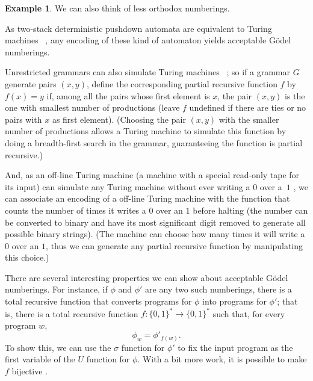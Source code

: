 \documentclass[12pt]{article}
\theoremstyle{definition}
\newtheorem{example}[definition]{Example}
\begin{document}
\begin{example}
    We can also think of less orthodox numberings.

    As two-stack deterministic pushdown automata are equivalent to Turing machines%
    ~\cite[p.~172]{HopcroftUllman1979},
    any encoding of these kind of automaton yields acceptable Gödel numberings.

    Unrestricted grammars can also simulate Turing machines%
    ~\cite[p.~221]{HopcroftUllman1979};
    so if a grammar $G$ generate pairs $(x, y)$,
    define the corresponding partial recursive function $f$
    by $f(x) = y$ if,
    among all the pairs whose first element is $x$,
    the pair $(x, y)$ is the one with smallest number of productions
    (leave $f$ undefined if there are ties or no pairs with $x$ as first element).
    (Choosing the pair $(x, y)$ with the smaller number of productions
    allows a Turing machine to simulate this function
    by doing a breadth-first search in the grammar,
    guaranteeing the function is partial recursive.)

    And, as an off-line Turing machine
    (a machine with a special read-only tape for its input)
    can simulate any Turing machine without ever writing a $0$ over a~$1$
    \cite[p.~174]{HopcroftUllman1979},
    we can associate an encoding of a off-line Turing machine
    with the function that counts the number of times
    it writes a $0$ over an $1$ before halting
    (the number can be converted to binary and have its most significant digit removed
    to generate all possible binary strings).
    (The machine can choose how many times it will write a $0$ over an $1$,
    thus we can generate any partial recursive function by manipulating this choice.)
\end{example}

There are several interesting properties we can show about acceptable Gödel numberings.
For instance,
if $\phi$ and $\phi'$ are any two such numberings,
there is a total recursive function that converts programs for $\phi$
into programs for $\phi'$;
that is, there is a total recursive function $f : \{0, 1\}^* \to \{0, 1\}^*$
such that, for every program $w$,
\begin{equation*}
    \phi_w = \phi'_{f(w)}.
\end{equation*}
To show this,
we can use the $\sigma$ function for $\phi'$
to fix the input program as the first variable of the $U$ function for $\phi$.
With a bit more work,
it is possible to make $f$ bijective \cite[p.~25]{Soare1987}.
\end{document}
